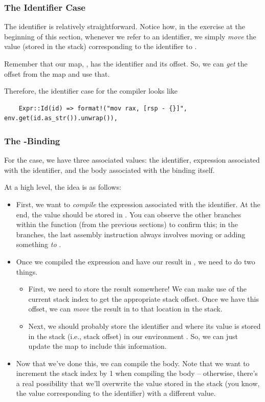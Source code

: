 \documentclass[letterpaper]{article}
\begin{document}
\subsubsection{The Identifier Case}
The identifier is relatively straightforward. Notice how, in the exercise at the beginning of this section, whenever we refer to an identifier, we simply \emph{move} the value (stored in the stack) corresponding to the identifier to . 

\bigskip 

Remember that our map, , has the identifier and its offset. So, we can \emph{get} the offset from the map and use that. 

\bigskip 

Therefore, the identifier case for the compiler looks like 
\begin{verbatim}
    Expr::Id(id) => format!("mov rax, [rsp - {}]", env.get(id.as_str()).unwrap()),\end{verbatim} 

\subsubsection{The -Binding}
For the  case, we have three associated values: the identifier, expression associated with the identifier, and the body associated with the binding itself. 

\bigskip 

At a high level, the idea is as follows:
\begin{itemize}
    \item First, we want to \emph{compile} the expression associated with the identifier. At the end, the value should be stored in . You can observe the other branches within the  function (from the previous sections) to confirm this; in the branches, the last assembly instruction always involves moving or adding something \emph{to} . 
    \item Once we compiled the expression and have our result in , we need to do two things. 
    \begin{itemize}
        \item First, we need to store the result somewhere! We can make use of the current stack index to get the appropriate stack offset. Once we have this offset, we can \emph{move} the result in  to that location in the stack.
        \item Next, we should probably store the identifier and where its value is stored in the stack (i.e., stack offset) in our environment . So, we can just update the map to include this information. 
    \end{itemize}
    \item Now that we've done this, we can compile the body. Note that we want to increment the stack index by 1 when compiling the body -- otherwise, there's a real possibility that we'll overwrite the value stored in the stack (you know, the value corresponding to the identifier) with a different value.
\end{itemize}
\end{document}
